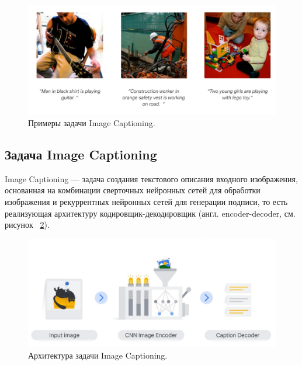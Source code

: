 \documentclass[a4paper,12pt]{extarticle}
\begin{document}
\begin{figure}[ht]
	\centering
	\includegraphics[scale=0.35]{image-captioning-example.png}
	\caption{Примеры задачи Image Captioning.}
	\label{fig:image-captioning-example}
\end{figure}

\subsection{Задача Image Captioning}

Image Captioning — задача создания текстового описания входного изображения, основанная на комбинации сверточных нейронных сетей для обработки изображения и рекуррентных нейронных сетей для генерации подписи, то есть реализующая архитектуру кодировщик-декодировщик (англ. encoder-decoder, см. рисунок ~\ref{fig:image-captioning-arch}).

\begin{figure}[ht]
	\centering
	\includegraphics[scale=0.4]{image-captioning-arch.png}
	\caption{Архитектура задачи Image Captioning.}
	\label{fig:image-captioning-arch}
\end{figure}
\end{document}
